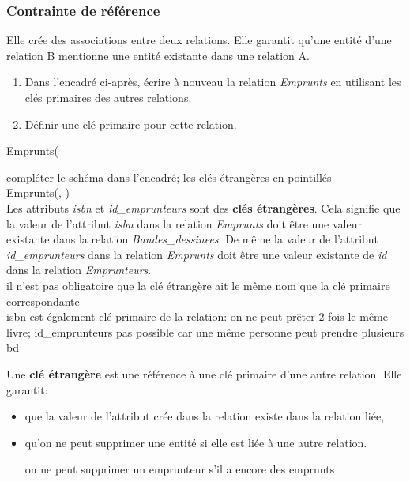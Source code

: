 \documentclass[a4paper,11pt]{article}
\begin{document}
\begin{Form}
\subsubsection{Contrainte de référence}
Elle crée des associations entre deux relations. Elle garantit qu'une entité d'une relation B mentionne une entité existante dans une relation A.
\begin{activite}
\begin{enumerate}
\item Dans l'encadré ci-après, écrire à nouveau la relation \emph{Emprunts} en utilisant les clés primaires des autres relations.
\item Définir une clé primaire pour cette relation.
\end{enumerate}
\end{activite}
\begin{framed}
Emprunts(
\end{framed}

\begin{commentprof}
compléter le schéma dans l'encadré; les clés étrangères en pointillés\\
Emprunts(\underline{}, )\\
Les attributs \emph{isbn} et \emph{id\_emprunteurs} sont des \textbf{clés étrangères}. Cela signifie que la valeur de l'attribut \emph{isbn} dans la relation \emph{Emprunts} doit être une valeur existante dans la relation \emph{Bandes\_dessinees}. De même la valeur de l'attribut \emph{id\_emprunteurs} dans la relation \emph{Emprunts} doit être une valeur existante  de \emph{id} dans la relation \emph{Emprunteurs}.\\
il n'est pas obligatoire que la clé étrangère ait le même nom que la clé primaire correspondante\\
isbn est également clé primaire de la relation: on ne peut prêter 2 fois le même livre; id\_emprunteurs pas possible car une même personne peut prendre plusieurs bd
\end{commentprof}
\begin{aretenir}[]
Une \textbf{clé étrangère} est une référence à une clé primaire d'une autre relation. Elle garantit:
\begin{itemize}
\item que la valeur de l'attribut crée dans la relation existe dans la relation liée,
\item qu'on ne peut supprimer une entité si elle est liée à une autre relation.
\begin{commentprof}
on ne peut supprimer un emprunteur s'il a encore des emprunts
\end{commentprof}
\end{itemize}
\end{aretenir}
\begin{commentprof}

\end{commentprof}
\end{Form}
\end{document}
